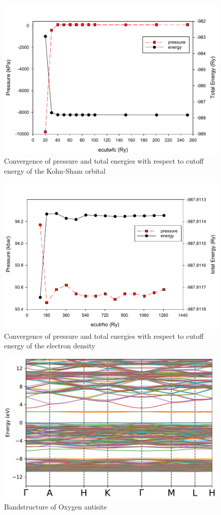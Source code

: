\begin{figure}[tbh!]
	\centering
	\includegraphics[width=0.8\linewidth]{"images/rnd/ecutwfc"}
	\caption[Convergence of pressure and total energies with respect to cutoff energy of the Kohn-Sham orbital]{Convergence of pressure and total energies with respect to cutoff energy of the Kohn-Sham orbital}
\end{figure}

\begin{figure}[tbh!]
	\centering
	\includegraphics[width=0.8\linewidth]{"images/rnd/ecutrho"}
	\caption[Convergence of pressure and total energies with respect to cutoff energy of the electron density]{Convergence of pressure and total energies with respect to cutoff energy of the electron density}
\end{figure}


\begin{figure}[tbh!]
	\centering
	\includegraphics[width=0.7\linewidth]{"images/bands_O-antisite"}
	\caption[Bandstructure of Oxygen antisite]{Bandstructure of Oxygen antisite}
\end{figure}

